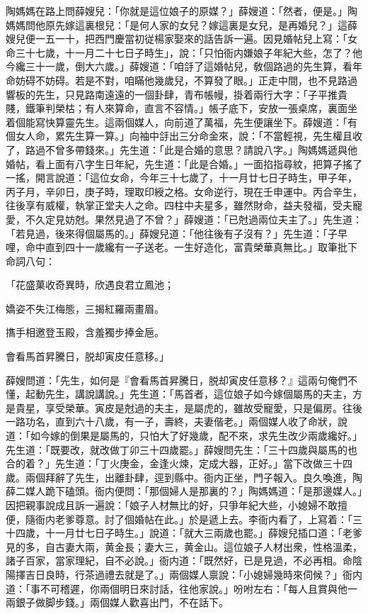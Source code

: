 陶媽媽在路上問薛嫂兒：「你就是這位娘子的原媒？」薛嫂道：「然者，便是。」陶媽媽問他原先嫁這裏根兒：「是何人家的女兒？嫁這裏是女兒，是再婚兒？」這薛嫂兒便一五一十，把西門慶當初従楊家娶來的話告訴一遍。因見婚帖兒上寫：「女命三十七歲，十一月二十七日子時生」，說：「只怕衙内嫌娘子年紀大些，怎了？他今纔三十一歲，倒大六歲。」薛嫂道：「咱㧱了這婚帖兒，敎個路過的先生算，看年命妨碍不妨碍。若是不對，咱瞞他幾歲兒，不算發了眼。」正走中間，也不見路過響板的先生，只見路南遠遠的一個卦肆，青布帳幔，掛着兩行大字：「子平推貴賤，鐵筆判榮枯；有人來算命，直言不容情。」帳子底下，安放一張桌席，裏面坐着個能寫快算靈先生。這兩個媒人，向前道了萬福，先生便讓坐下。薛嫂道：「有個女人命，累先生算一算。」向袖中㧱出三分命金來，說：「不當輕視，先生權且收了，路過不曾多帶錢來。」先生道：「此是合婚的意思？請說八字。」陶媽媽遞與他婚帖，看上面有八字生日年紀，先生道：「此是合婚。」一面掐指尋紋，把算子搖了一搖，開言說道：「這位女命，今年三十七歲了，十一月廿七日子時生，甲子年，丙子月，辛卯日，庚子時，理取印綬之格。女命逆行，現在壬申運中。丙合辛生，往後享有威權，執掌正堂夫人之命。四柱中夫星多，雖然財命，益夫發福，受夫寵愛，不久定見妨尅。果然見過了不曾？」薛嫂道：「已尅過兩位夫主了。」先生道：「若見過，後來得個屬馬的。」薛嫂兒道：「他往後有子沒有？」先生道：「子早哩，命中直到四十一歲纔有一子送老。一生好造化，富貴榮華真無比。」取筆批下命詞八句：

\begin{myquote}
「花盛菓收奇異時，欣遇良君立鳳池；

嬌姿不失江梅態，三揭紅羅兩畫眉。

㩦手相邀登玉殿，含羞獨步捧金巵。

會看馬首昇騰日，脱却寅皮任意移。」
\end{myquote}

薛嫂問道：「先生，如何是『會看馬首昇騰日，脱却寅皮任意移？』這兩句俺們不懂，起動先生，講說講說。」先生道：「馬首者，這位娘子如今嫁個屬馬的夫主，方是貴星，享受榮華。寅皮是尅過的夫主，是屬虎的，雖故受寵愛，只是偏房。往後一路功名，直到六十八歲，有一子，壽終，夫妻偕老。」兩個媒人收了命狀，說道：「如今嫁的倒果是屬馬的，只怕大了好幾歲，配不來，求先生改少兩歲纔好。」先生道：「既要改，就改做丁卯三十四歲罷。」薛嫂問先生：「三十四歲與屬馬的也合的着？」先生道：「丁火庚金，金逢火煉，定成大器，正好。」當下改做三十四歲。兩個拜辭了先生，出離卦肆，逕到縣中。衙内正坐，門子報入。良久喚進，陶薛二媒人跪下磕頭。衙内便問：「那個婦人是那裏的？」陶媽媽道：「是那邊媒人。」因把親事說成且訴一遍說：「娘子人材無比的好，只爭年紀大些，小媳婦不敢擅便，隨衙内老爹尊意。討了個婚帖在此。」於是遞上去。李衙内看了，上寫着：「三十四歲，十一月廿七日子時生。」說道：「就大三兩歲也罷。」薛嫂兒插口道：「老爹見的多，自古妻大兩，黄金長；妻大三，黄金山。這位娘子人材出衆，性格溫柔，諸子百家，當家理紀，自不必說。」衙内道：「既然好，已是見過，不必再相。命陰陽擇吉日良時，行茶過禮去就是了。」兩個媒人禀說：「小媳婦幾時來伺候？」衙内道：「事不可稽遲，你兩個明日來討話，往他家說。」吩咐左右：「每人且賞與他一兩銀子做脚步錢。」兩個媒人歡喜出門，不在話下。

